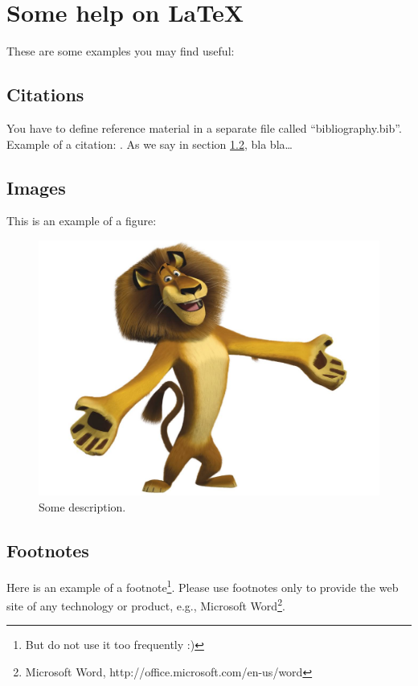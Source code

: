 \chapter{Some help on \LaTeX}

These are some examples you may find useful:

\section{Citations}
You have to define reference material in a separate file called
``bibliography.bib''. Example of a citation: \cite{Abrahamsson2002}. As we say in section \ref{sec:figures}, bla bla\ldots

\section{Images}
\label{sec:figures}

This is an example of a figure:

\begin{figure}[ht]
	\centering
	\includegraphics[scale=0.25]{img/figure.pdf}
	\caption{Some description.}
	\label{fig:Lion}
\end{figure}

\section{Footnotes}
Here is an example of a footnote\footnote{But do not use it too frequently :)}.
Please use footnotes only to provide the web site of any technology or product, e.g., Microsoft Word\footnote{Microsoft Word, http://office.microsoft.com/en-us/word}.

